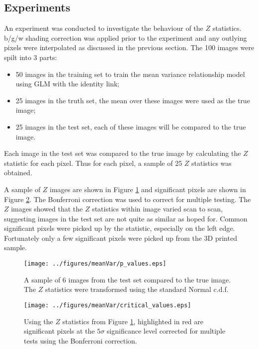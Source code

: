 \documentclass[a4paper]{proc}
\begin{document}
\subsection{Experiments}
An experiment was conducted to investigate the behaviour of the $Z$ statistics. b/g/w shading correction was applied prior to the experiment and any outlying pixels were interpolated as discussed in the previous section. The 100 images were spilt into 3 parts:
\begin{itemize}
	\item 50 images in the training set to train the mean variance relationship model using GLM with the identity link;
	\item 25 images in the truth set, the mean over these images were used as the true image;
	\item 25 images in the test set, each of these images will be compared to the true image.
\end{itemize}
Each image in the test set was compared to the true image by calculating the $Z$ statistic for each pixel. Thus for each pixel, a sample of 25 $Z$ statistics was obtained.

A sample of $Z$ images are shown in Figure \ref{fig:p_values} and significant pixels are shown in Figure \ref{fig:critical_values}. The Bonferroni correction was used to correct for multiple testing. The $Z$ images showed that the $Z$ statistics within image varied scan to scan, suggesting images in the test set are not quite as similar as hoped for. Common significant pixels were picked up by the statistic, especially on the left edge. Fortunately only a few significant pixels were picked up from the 3D printed sample.

\begin{figure}
	\centering
	\texttt{[image: ../figures/meanVar/p\_values.eps]}
	\caption{A sample of 6 images from the test set compared to the true image. The $Z$ statistics were transformed using the standard Normal c.d.f.}
	\label{fig:p_values}
\end{figure}

\begin{figure}
	\centering
	\texttt{[image: ../figures/meanVar/critical\_values.eps]}
	\caption{Using the $Z$ statistics from Figure \ref{fig:p_values}, highlighted in red are significant pixels at the $5\sigma$ significance level corrected for multiple tests using the Bonferroni correction.}
	\label{fig:critical_values}
\end{figure}
\end{document}
